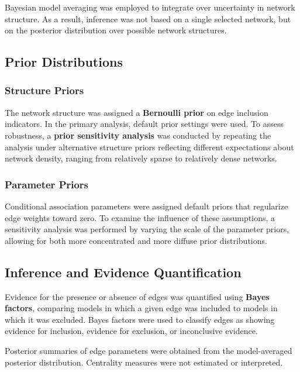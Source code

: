 \documentclass[
  letterpaper,
  DIV=11,
  numbers=noendperiod]{scrartcl}
\begin{document}
Bayesian model averaging was employed to integrate over uncertainty in
network structure. As a result, inference was not based on a single
selected network, but on the posterior distribution over possible
network structures.

\subsection{Prior Distributions}\label{prior-distributions}

\subsubsection{Structure Priors}\label{structure-priors}

The network structure was assigned a \textbf{Bernoulli prior} on edge
inclusion indicators. In the primary analysis, default prior settings
were used. To assess robustness, a \textbf{prior sensitivity analysis}
was conducted by repeating the analysis under alternative structure
priors reflecting different expectations about network density, ranging
from relatively sparse to relatively dense networks.

\subsubsection{Parameter Priors}\label{parameter-priors}

Conditional association parameters were assigned default priors that
regularize edge weights toward zero. To examine the influence of these
assumptions, a sensitivity analysis was performed by varying the scale
of the parameter priors, allowing for both more concentrated and more
diffuse prior distributions.

\subsection{Inference and Evidence
Quantification}\label{inference-and-evidence-quantification}

Evidence for the presence or absence of edges was quantified using
\textbf{Bayes factors}, comparing models in which a given edge was
included to models in which it was excluded. Bayes factors were used to
classify edges as showing evidence for inclusion, evidence for
exclusion, or inconclusive evidence.

Posterior summaries of edge parameters were obtained from the
model-averaged posterior distribution. Centrality measures were not
estimated or interpreted.
\end{document}

